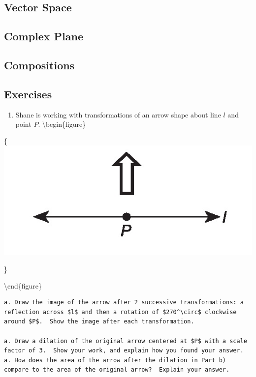 \documentclass[
]{book}
\providecommand{\tightlist}{%
  \setlength{\itemsep}{0pt}\setlength{\parskip}{0pt}}
\theoremstyle{definition}
\theoremstyle{definition}
\theoremstyle{definition}
\theoremstyle{definition}
\theoremstyle{remark}
\begin{document}
\hypertarget{vector-space-1}{%
\subsection{Vector Space}\label{vector-space-1}}

\hypertarget{complex-plane-5}{%
\subsection{Complex Plane}\label{complex-plane-5}}

\hypertarget{compositions-2}{%
\subsection{Compositions}\label{compositions-2}}

\hypertarget{exercises-57}{%
\subsection{Exercises}\label{exercises-57}}

\begin{enumerate}
\def\labelenumi{\arabic{enumi}.}
\tightlist
\item
  Shane is working with transformations of an arrow shape about line \(l\) and point \(P\).
  \textbackslash begin\{figure\}
\end{enumerate}

\{\centering \includegraphics[width=0.35\linewidth]{images/uparrow}

\}

\textbackslash end\{figure\}

\begin{verbatim}
a. Draw the image of the arrow after 2 successive transformations: a reflection across $l$ and then a rotation of $270^\circ$ clockwise around $P$.  Show the image after each transformation.

a. Draw a dilation of the original arrow centered at $P$ with a scale factor of 3.  Show your work, and explain how you found your answer.
a. How does the area of the arrow after the dilation in Part b) compare to the area of the original arrow?  Explain your answer.
\end{verbatim}
\end{document}
